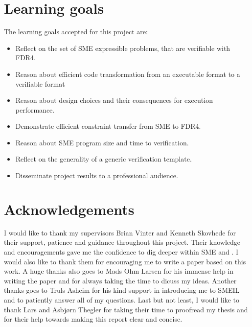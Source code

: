 \section{Learning goals}
The learning goals accepted for this project are:
\begin{itemize}
\item Reflect on the set of SME expressible problems, that are verifiable with FDR4.
\item Reason about efficient code transformation from an executable format to a verifiable format
\item Reason about design choices and their consequences for execution performance.
\item Demonstrate efficient constraint transfer from SME to FDR4.
\item Reason about SME program size and time to verification.
\item Reflect on the generality of a generic verification template.
\item Disseminate project results to a professional audience.
\end{itemize}

\section{Acknowledgements}
I would like to thank my supervisors Brian Vinter and Kenneth Skovhede for their support, patience and guidance throughout this project. Their knowledge and encouragements gave me the confidence to dig deeper within SME and \cspm{}. I would also like to thank them for encouraging me to write a paper based on this work.
A huge thanks also goes to Mads Ohm Larsen for his immense help in writing the paper and for always taking the time to dicuss my ideas.
Another thanks goes to Truls Asheim for his kind support in introducing me to SMEIL and to patiently answer all of my questions.
Last but not least, I would like to thank Lars and Asbj\o rn Thegler for taking their time to proofread my thesis and for their help towards making this report clear and concise.
